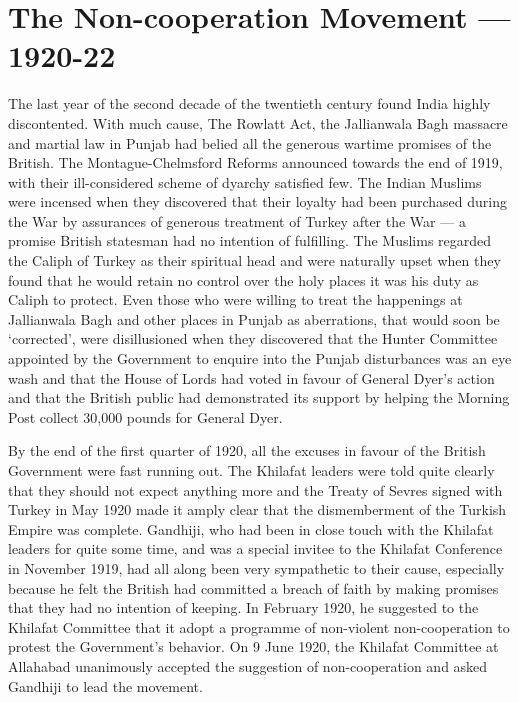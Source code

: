 
\chapter{The Non-cooperation Movement — 1920-22}



The last year of the second decade of the twentieth century found India highly discontented. With much cause, The Rowlatt Act, the Jallianwala Bagh massacre and martial law in Punjab had belied all the generous wartime promises of the British. The Montague-Chelmsford Reforms announced towards the end of 1919, with their ill-considered scheme of dyarchy satisfied few. The Indian Muslims were incensed when they discovered that their loyalty had been purchased during the War by assurances of generous treatment of Turkey after the War — a promise British statesman had no intention of fulfilling. The Muslims regarded the Caliph of Turkey as their spiritual head and were naturally upset when they found that he would retain no control over the holy places it was his duty as Caliph to protect. Even those who were willing to treat the happenings at Jallianwala Bagh and other places in Punjab as aberrations, that would soon be `corrected', were disillusioned when they discovered that the Hunter Committee appointed by the Government to enquire into the Punjab disturbances was an eye wash and that the House of Lords had voted in favour of General Dyer's action and that the British public had demonstrated its support by helping the Morning Post collect 30,000 pounds for General Dyer. 

By the end of the first quarter of 1920, all the excuses in favour of the British Government were fast running out. The Khilafat leaders were told quite clearly that they should not expect anything more and the Treaty of Sevres signed with Turkey in May 1920 made it amply clear that the dismemberment of the Turkish Empire was complete. Gandhiji, who had been in close touch with the Khilafat leaders for quite some time, and was a special invitee to the Khilafat Conference in November 1919, had all along been very sympathetic to their cause, especially because he felt the British had committed a breach of faith by making promises that they had no intention of keeping. In February 1920, he suggested to the Khilafat Committee that it adopt a programme of non-violent non-cooperation to protest the Government's behavior. On 9 June 1920, the Khilafat Committee at Allahabad unanimously accepted the suggestion of non-cooperation and asked Gandhiji to lead the movement. 

